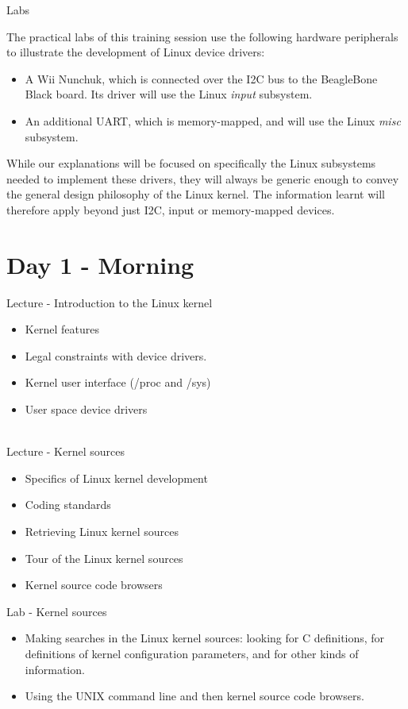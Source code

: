 \documentclass[a4paper,12pt,obeyspaces,spaces,hyphens]{article}
\begin{document}
\feagendaonecolumn
{Labs}
{
  The practical labs of this training session use the following
  hardware peripherals to illustrate the development of Linux device
  drivers:

  \begin{itemize}
  \item A Wii Nunchuk, which is connected over the I2C bus to the
    BeagleBone Black board. Its driver will use the Linux {\em input}
    subsystem.
  \item An additional UART, which is memory-mapped, and will use the
    Linux {\em misc} subsystem.
  \end{itemize}

  While our explanations will be focused on specifically the Linux
  subsystems needed to implement these drivers, they will always be
  generic enough to convey the general design philosophy of the Linux
  kernel. The information learnt will therefore apply beyond just
  I2C, input or memory-mapped devices.
}


\section{Day 1 - Morning}

\feagendaonecolumn
{Lecture - Introduction to the Linux kernel}
{
  \begin{itemize}
  \item Kernel features
  \item Legal constraints with device drivers.
  \item Kernel user interface (/proc and /sys)
  \item User space device drivers
  \end{itemize}
}
\\
\feagendatwocolumn
{Lecture - Kernel sources}
{
  \begin{itemize}
  \item Specifics of Linux kernel development
  \item Coding standards
  \item Retrieving Linux kernel sources
  \item Tour of the Linux kernel sources
  \item Kernel source code browsers
  \end{itemize}
}
{Lab - Kernel sources}
{
  \begin{itemize}
  \item Making searches in the Linux kernel sources: looking for C
    definitions, for definitions of kernel configuration parameters,
    and for other kinds of information.
  \item Using the UNIX command line and then kernel source code
    browsers.
 \end{itemize}
}
\end{document}
